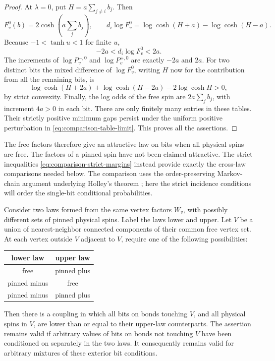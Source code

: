 \begin{proof}
At \(\lambda=0\), put \(H=a\sum_{j\ne i}b_j\).  Then
\[
 F_v^0(b)=2\cosh\left(a\sum_jb_j\right),\qquad
 d_i\log F_v^0=\log\cosh(H+a)-\log\cosh(H-a).
\]
Because \(-1<\tanh u<1\) for finite \(u\),
\begin{equation}
 -2a<d_i\log F_v^0<2a.
 \label{eq:comparison-base-pin-gaps}
\end{equation}
The increments of \(\log P_v^{-,0}\) and \(\log P_v^{+,0}\) are
exactly \(-2a\) and \(2a\).  For two distinct bits the mixed difference
of \(\log F_v^0\), writing \(H\) now for the contribution from all the
remaining bits, is
\[
 \log\cosh(H+2a)+\log\cosh(H-2a)-2\log\cosh H>0,
\]
by strict convexity.  Finally, the log odds of the free spin are
\(2a\sum_jb_j\), with increment \(4a>0\) in each bit.
There are only finitely many entries in these tables.  Their strictly
positive minimum gaps persist under the uniform positive perturbation
in \eqref{eq:comparison-table-limit}.  This proves all the assertions.
\end{proof}

The free factors therefore give an attractive law on bits when all
physical spins are free.  The factors of a pinned spin have not been
claimed attractive.  The strict inequalities
\eqref{eq:comparison-strict-margins} instead provide exactly the
cross-law comparisons needed below.  The comparison uses the
order-preserving Markov-chain argument underlying Holley's theorem
\citep[Theorem~(6)]{Holley1974}; here the strict incidence conditions
will order the single-bit conditional probabilities.

\begin{proposition}
\label{prop:strict-incidence}
Consider two laws formed from the same vertex factors \(W_v\), with
possibly different sets of pinned physical spins.  Label the laws lower
and upper.  Let \(V\) be a union of nearest-neighbor connected components
of their common free vertex set.  At each vertex outside \(V\) adjacent
to \(V\), require one of the following possibilities:
\begin{center}
\begin{tabular}{c|c}
lower law & upper law\\ \hline
free & pinned plus\\
pinned minus & free\\
pinned minus & pinned plus
\end{tabular}
\end{center}
Then there is a coupling in which all bits on bonds touching \(V\), and
all physical spins in \(V\), are lower than or equal to their upper-law
counterparts.  The assertion remains valid if arbitrary values of bits
on bonds not touching \(V\) have been conditioned on separately in the
two laws.  It consequently remains valid for arbitrary mixtures of
these exterior bit conditions.
\end{proposition}

